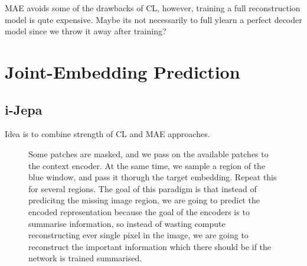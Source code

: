 \documentclass[11pt]{article}
\begin{document}
MAE avoids some of the drawbacks of CL, however, training a full reconstruction model is qute expensive. Maybe its not necessarily to full ylearn a perfect decoder model since we throw it away after training?

\section{Joint-Embedding Prediction}\label{sect:joint-embedding-prediction}

\subsection{i-Jepa}

Idea is to combine strength of CL and MAE approaches.

\begin{figure}[H]
    \centering
    \caption*{Some patches are masked, and we pass on the available patches to the context encoder. At the same time, we sample a region of the blue window, and pass it thorugh the target embedding. Repeat this for several regions. The goal of this paradigm is that instead of predicitng the missing image region, we are going to predict the encoded representation because the goal of the encoders is to summarise information, so instead of wasting compute reconstructing ever single pixel in the image, we are going to reconstruct the important information which there should be if the network is trained summarised.}
\end{figure}


\begin{figure}[H]
    \centering
\end{figure}
\end{document}
